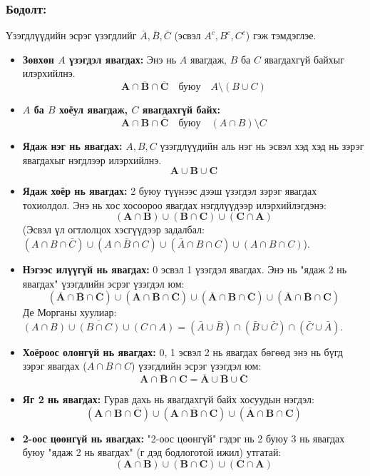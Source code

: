 \documentclass[11pt,a4paper]{article}
\begin{document}
\subsubsection*{Бодолт:}

Үзэгдлүүдийн эсрэг үзэгдлийг $\bar{A}, \bar{B}, \bar{C}$ (эсвэл $A^c, B^c, C^c$) гэж тэмдэглэе.

\begin{itemize}[leftmargin=1.4em, itemsep=3pt]
  \item[\textbf{a)}] \textbf{Зөвхөн $A$ үзэгдэл явагдах:}
  Энэ нь $A$ явагдаж, $B$ ба $C$ явагдахгүй байхыг илэрхийлнэ.
  \[
    \mathbf{A \cap \overline{B} \cap \overline{C}} \quad \text{буюу} \quad A \setminus (B \cup C)
  \]
  \item[\textbf{б)}] \textbf{$A$ ба $B$ хоёул явагдаж, $C$ явагдахгүй байх:}
  \[
    \mathbf{A \cap B \cap \overline{C}} \quad \text{буюу} \quad (A \cap B) \setminus C
  \]
  \item[\textbf{в)}] \textbf{Ядаж нэг нь явагдах:}
  $A, B, C$ үзэгдлүүдийн аль нэг нь эсвэл хэд хэд нь зэрэг явагдахыг нэгдлээр илэрхийлнэ.
  \[
    \mathbf{A \cup B \cup C}
  \]
  \item[\textbf{г)}] \textbf{Ядаж хоёр нь явагдах:}
  2 буюу түүнээс дээш үзэгдэл зэрэг явагдах тохиолдол. Энэ нь хос хосоороо явагдах нэгдлүүдээр илэрхийлэгдэнэ:
  \[
    \mathbf{(A \cap B) \cup (B \cap C) \cup (C \cap A)}
  \]
  (Эсвэл үл огтлолцох хэсгүүдээр задалбал: $(A \cap B \cap \bar{C}) \cup (A \cap \bar{B} \cap C) \cup (\bar{A} \cap B \cap C) \cup (A \cap B \cap C)$).
  \item[\textbf{д)}] \textbf{Нэгээс илүүгүй нь явагдах:}
  0 эсвэл 1 үзэгдэл явагдах. Энэ нь "ядаж 2 нь явагдах" үзэгдлийн эсрэг үзэгдэл юм:
  \[
    \mathbf{(\overline{A} \cap \overline{B} \cap \overline{C}) \cup (A \cap \overline{B} \cap \overline{C}) \cup (\overline{A} \cap B \cap \overline{C}) \cup (\overline{A} \cap \overline{B} \cap C)}
  \]
  Де Морганы хуулиар: $\overline{(A \cap B) \cup (B \cap C) \cup (C \cap A)} = (\bar{A} \cup \bar{B}) \cap (\bar{B} \cup \bar{C}) \cap (\bar{C} \cup \bar{A})$.
  \item[\textbf{е)}] \textbf{Хоёроос олонгүй нь явагдах:}
  0, 1 эсвэл 2 нь явагдах бөгөөд энэ нь бүгд зэрэг явагдах ($A \cap B \cap C$) үзэгдлийн эсрэг үзэгдэл юм:
  \[
    \mathbf{\overline{A \cap B \cap C} = \overline{A} \cup \overline{B} \cup \overline{C}}
  \]
  \item[\textbf{ё)}] \textbf{Яг 2 нь явагдах:}
  Гурав дахь нь явагдахгүй байх хосуудын нэгдэл:
  \[
    \mathbf{(A \cap B \cap \overline{C}) \cup (A \cap \overline{B} \cap C) \cup (\overline{A} \cap B \cap C)}
  \]
  \item[\textbf{ж)}] \textbf{2-оос цөөнгүй нь явагдах:}
  "2-оос цөөнгүй" гэдэг нь 2 буюу 3 нь явагдах буюу "ядаж 2 нь явагдах" (г дэд бодлоготой ижил) утгатай:
  \[
    \mathbf{(A \cap B) \cup (B \cap C) \cup (C \cap A)}
  \]
\end{itemize}
\end{document}
